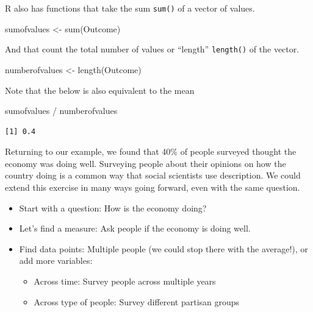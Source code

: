 \documentclass[
  letterpaper,
  DIV=11,
  numbers=noendperiod]{scrreprt}
\newenvironment{Shaded}{\begin{snugshade}}{\end{snugshade}}
\newcommand{\FunctionTok}[1]{\textcolor[rgb]{0.28,0.35,0.67}{#1}}
\newcommand{\NormalTok}[1]{\textcolor[rgb]{0.00,0.23,0.31}{#1}}
\newcommand{\OtherTok}[1]{\textcolor[rgb]{0.00,0.23,0.31}{#1}}
\newcommand{\SpecialCharTok}[1]{\textcolor[rgb]{0.37,0.37,0.37}{#1}}
\providecommand{\tightlist}{%
  \setlength{\itemsep}{0pt}\setlength{\parskip}{0pt}}\usepackage{longtable,booktabs,array}
\begin{document}
R also has functions that take the sum \texttt{sum()} of a vector of
values.

\begin{Shaded}
\begin{Highlighting}[]
\NormalTok{sumofvalues }\OtherTok{\textless{}{-}} \FunctionTok{sum}\NormalTok{(Outcome)}
\end{Highlighting}
\end{Shaded}

And that count the total number of values or ``length''
\texttt{length()} of the vector.

\begin{Shaded}
\begin{Highlighting}[]
\NormalTok{numberofvalues }\OtherTok{\textless{}{-}} \FunctionTok{length}\NormalTok{(Outcome)}
\end{Highlighting}
\end{Shaded}

Note that the below is also equivalent to the mean

\begin{Shaded}
\begin{Highlighting}[]
\NormalTok{sumofvalues }\SpecialCharTok{/}\NormalTok{ numberofvalues}
\end{Highlighting}
\end{Shaded}

\begin{verbatim}
[1] 0.4
\end{verbatim}

Returning to our example, we found that 40\% of people surveyed thought
the economy was doing well. Surveying people about their opinions on how
the country doing is a common way that social scientists use
description. We could extend this exercise in many ways going forward,
even with the same question.

\begin{itemize}
\tightlist
\item
  Start with a question: How is the economy doing?
\item
  Let's find a measure: Ask people if the economy is doing well.
\item
  Find data points: Multiple people (we could stop there with the
  average!), or add more variables:

  \begin{itemize}
  \tightlist
  \item
    Across time: Survey people across multiple years
  \item
    Across type of people: Survey different partisan groups
  \end{itemize}
\end{itemize}
\end{document}
